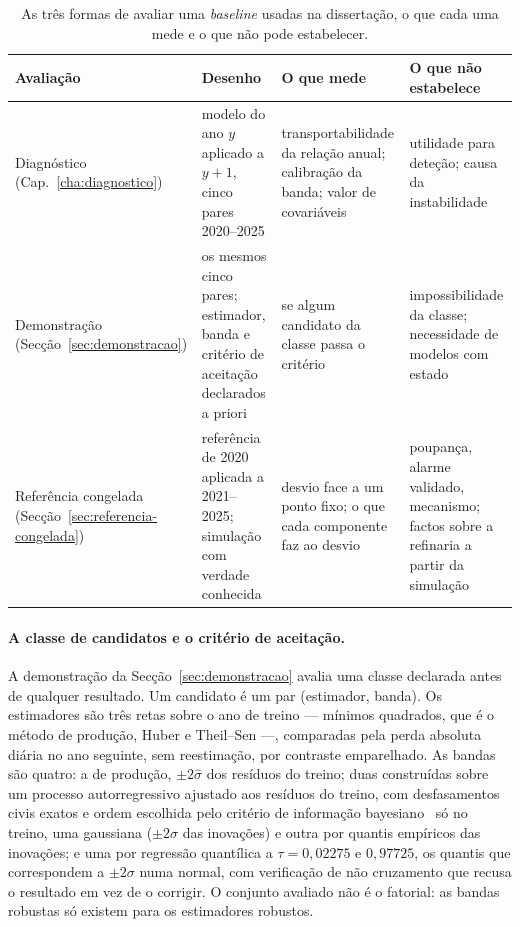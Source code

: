 \begin{table}[htbp]
  \centering
  \caption[Os três estimandos deste capítulo]{As três formas de avaliar uma
  \emph{baseline} usadas na dissertação, o que cada uma mede e o que não
  pode estabelecer.}
  \label{tab:estimandos}
  \small
  \begin{tabular}{p{3.0cm}p{3.6cm}p{3.6cm}p{3.4cm}}
    \toprule
    Avaliação & Desenho & O que mede & O que não estabelece \\
    \midrule
    Diagnóstico (Cap.~\ref{cha:diagnostico}) & modelo do ano $y$ aplicado a $y{+}1$, cinco pares 2020--2025 & transportabilidade da relação anual; calibração da banda; valor de covariáveis & utilidade para deteção; causa da instabilidade \\
    Demonstração (Secção~\ref{sec:demonstracao}) & os mesmos cinco pares; estimador, banda e critério de aceitação declarados a priori & se algum candidato da classe passa o critério & impossibilidade da classe; necessidade de modelos com estado \\
    Referência congelada (Secção~\ref{sec:referencia-congelada}) & referência de 2020 aplicada a 2021--2025; simulação com verdade conhecida & desvio face a um ponto fixo; o que cada componente faz ao desvio & poupança, alarme validado, mecanismo; factos sobre a refinaria a partir da simulação \\
    \bottomrule
  \end{tabular}
\end{table}

\paragraph{A classe de candidatos e o critério de aceitação.} A demonstração
da Secção~\ref{sec:demonstracao} avalia uma classe declarada antes de
qualquer resultado. Um candidato é um par (estimador, banda). Os estimadores
são três retas sobre o ano de treino --- mínimos quadrados, que é o método de
produção, Huber e Theil--Sen ---, comparadas pela perda absoluta diária no
ano seguinte, sem reestimação, por contraste emparelhado. As bandas são
quatro: a de produção, $\pm2\hat\sigma$ dos resíduos do treino; duas
construídas sobre um processo autorregressivo ajustado aos resíduos do
treino, com desfasamentos civis exatos e ordem escolhida pelo critério de
informação bayesiano~\cite{Schwarz1978} só no treino, uma gaussiana
($\pm2\hat\sigma$ das inovações) e outra por quantis empíricos das
inovações; e uma por regressão quantílica a $\tau = 0{,}02275$ e
$0{,}97725$, os quantis que correspondem a $\pm2\sigma$ numa normal, com
verificação de não cruzamento que recusa o resultado em vez de o corrigir.
O conjunto avaliado não é o fatorial: as bandas robustas só existem para os
estimadores robustos.

